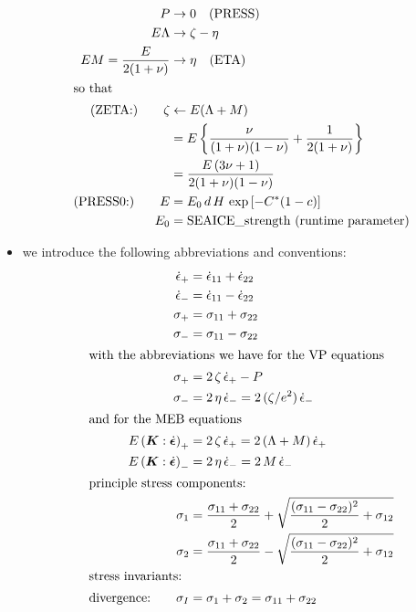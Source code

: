 \documentclass[12pt]{article}
\newcommand{\sr}{\dot{\epsilon}}
\newcommand{\srb}{\dot{\bm{\epsilon}}}
\begin{document}
\begin{itemize}
  \begin{align}
    \label{eq:p0}     P &\rightarrow0 \quad\text{(PRESS)}\\
    \label{eq:lambda} E\Lambda &\rightarrow \zeta - \eta \\
    \label{eq:mu}     EM
    = \frac{E}{2(1+\nu)} &\rightarrow \eta \quad\text{(ETA)} \\
    \intertext{so that}
    \label{eq:zeta} \text{(ZETA:)}\qquad
    \zeta &\leftarrow E(\Lambda+M) \\
                &= E\left\{\frac{\nu}{(1+\nu)(1-\nu)} +
                  \frac{1}{2(1+\nu)}\right\} \nonumber \\
                &= \frac{E\,(3\nu+1)}{2(1+\nu)(1-\nu)} \nonumber \\
    \text{(PRESS0:)}\qquad E &= E_0\,d\,H\,\exp\left[-C^*(1-c)\right] \\
    E_0&=\text{SEAICE\_strength (runtime parameter)}
  \end{align}
\item we introduce the following abbreviations and conventions:
  \begin{align}
    \sr_{+}&=\sr_{11}+\sr_{22}\\
    \sr_{-}&=\sr_{11}-\sr_{22}\\
    \sigma_{+}&=\sigma_{11}+\sigma_{22}\\
    \sigma_{-}&=\sigma_{11}-\sigma_{22} \\
    \intertext{with the abbreviations we have for the VP equations}
    \sigma_{+} &= 2\,\zeta\,\sr_{+} - P \\
    \sigma_{-} &= 2 \,\eta\,\sr_{-} = 2\,(\zeta/e^2)\,\sr_{-}\\
    \intertext{and for the MEB equations}
    \label{eq:mebplus} E\left(\bm{K}:\srb\right)_{+} &= 2\,\zeta\,\sr_{+}
    = 2\,(\Lambda+M)\,\sr_{+}\\
    \label{eq:mebminus}E\left(\bm{K}:\srb\right)_{-} &= 2\, \eta\,\sr_{-}
    = 2\,M\,\sr_{-}\\
    \intertext{principle stress components:}
    \sigma_1 &=\frac{\sigma_{11}+\sigma_{22}}{2}
               + \sqrt{\frac{(\sigma_{11}-\sigma_{22})^2}{2}+\sigma_{12}}\\
    \sigma_2 &=\frac{\sigma_{11}+\sigma_{22}}{2}
               - \sqrt{\frac{(\sigma_{11}-\sigma_{22})^2}{2}+\sigma_{12}}\\
    \intertext{stress invariants:}
    \text{divergence:}\qquad\sigma_{I} &= \sigma_1+\sigma_2
                                         = \sigma_{11}+\sigma_{22}\\

\end{align}
\end{itemize}
\end{document}

